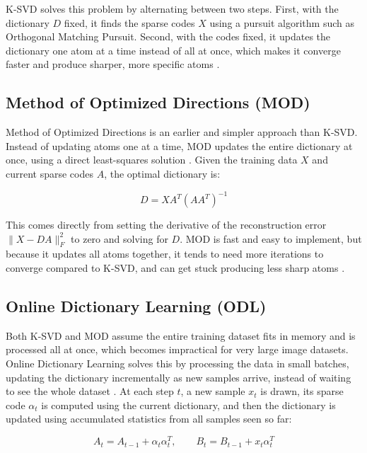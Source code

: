 K-SVD solves this problem by alternating between two steps. First, with the dictionary $D$ fixed, it finds the sparse codes $X$ using a pursuit algorithm
such as Orthogonal Matching Pursuit. Second, with the codes fixed, it updates the dictionary one atom at a time instead of all at once, which makes it
converge faster and produce sharper, more specific atoms \cite{1710377}.

\subsection{Method of Optimized Directions (MOD)}

Method of Optimized Directions is an earlier and simpler approach than K-SVD. Instead of updating atoms one at a time, MOD updates the entire dictionary at once,
using a direct least-squares solution \cite{760624}. Given the training data $X$ and current sparse codes $A$, the optimal dictionary is:

\begin{equation}[MOD Dictionary Update]
D = X A^T (A A^T)^{-1}
\end{equation}

This comes directly from setting the derivative of the reconstruction error $\|X - DA\|_F^2$ to zero and solving for $D$. MOD is fast and easy to implement,
but because it updates all atoms together, it tends to need more iterations to converge compared to K-SVD, and can get stuck producing less sharp atoms \cite{760624}.

\subsection{Online Dictionary Learning (ODL)}
\label{subsec:odl}

Both K-SVD and MOD assume the entire training dataset fits in memory and is processed all at once, which becomes impractical for very large image datasets.
Online Dictionary Learning solves this by processing the data in small batches, updating the dictionary incrementally as new samples arrive,
instead of waiting to see the whole dataset \cite{10.1145/1553374.1553463}. At each step $t$, a new sample $x_t$ is drawn,
its sparse code $\alpha_t$ is computed using the current dictionary, and then the dictionary is updated using accumulated statistics from all samples seen so far:

\begin{equation}[ODL Accumulated Statistics]
A_t = A_{t-1} + \alpha_t \alpha_t^T, \qquad B_t = B_{t-1} + x_t \alpha_t^T
\end{equation}

